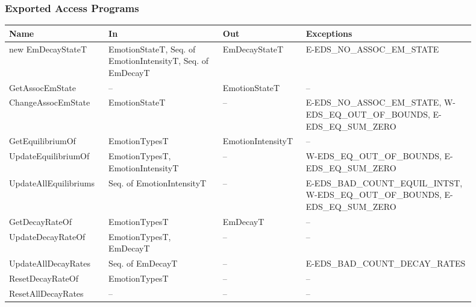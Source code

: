 \subsubsection{Exported Access Programs}
\begin{center}
    \small
    \renewcommand{\arraystretch}{1.1}
    \begin{tabular}{m{0.185\linewidth} m{0.23\linewidth} m{0.15\linewidth}
            m{0.335\linewidth}}
        \toprule
        \textbf{Name} & \textbf{In} & \textbf{Out} & \textbf{Exceptions} \\
        \midrule

        \rowcolor[gray]{0.9}new EmDecayStateT & EmotionStateT, \newline Seq. of
        EmotionIntensityT, \newline Seq. of EmDecayT & EmDecayStateT &
        E-EDS\_NO\_ASSOC\_EM\_STATE \\

        GetAssocEmState & -- & EmotionStateT & -- \\

        \rowcolor[gray]{0.9}ChangeAssocEmState & EmotionStateT & -- &
        E-EDS\_NO\_ASSOC\_EM\_STATE, \newline W-EDS\_EQ\_OUT\_OF\_BOUNDS,
        \newline E-EDS\_EQ\_SUM\_ZERO \\

        GetEquilibriumOf & EmotionTypesT & EmotionIntensityT & -- \\

        \rowcolor[gray]{0.9}UpdateEquilibriumOf & EmotionTypesT, \newline
        EmotionIntensityT & -- & W-EDS\_EQ\_OUT\_OF\_BOUNDS, \newline
        E-EDS\_EQ\_SUM\_ZERO \\

        UpdateAllEquilibriums & Seq. of EmotionIntensityT &
        -- & E-EDS\_BAD\_COUNT\_EQUIL\_INTST, \newline
        W-EDS\_EQ\_OUT\_OF\_BOUNDS,
        \newline E-EDS\_EQ\_SUM\_ZERO \\

        \rowcolor[gray]{0.9}GetDecayRateOf & EmotionTypesT & EmDecayT & -- \\

        UpdateDecayRateOf & EmotionTypesT, \newline EmDecayT & -- & -- \\

        \rowcolor[gray]{0.9}UpdateAllDecayRates & Seq. of EmDecayT & -- &
        E-EDS\_BAD\_COUNT\_DECAY\_RATES \\

        ResetDecayRateOf & EmotionTypesT & -- & -- \\

        \rowcolor[gray]{0.9}ResetAllDecayRates & -- & -- & -- \\

        \bottomrule
    \end{tabular}
\end{center}

